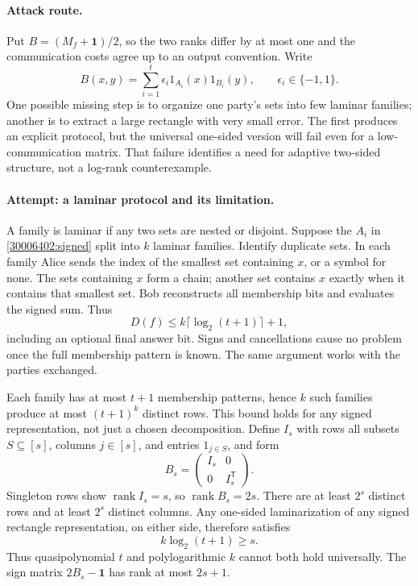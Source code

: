 \documentclass[11pt,a4paper]{article}
\numberwithin{equation}{section}
\begin{document}
\paragraph{Attack route.}
Put $B=(M_f+\mathbf1)/2$, so the two ranks differ by at most one and the
communication costs agree up to an output convention. Write
\begin{equation}\label{30006402:signed}
 B(x,y)=\sum_{i=1}^t\epsilon_i1_{A_i}(x)1_{B_i}(y),
 \qquad\epsilon_i\in\{-1,1\}.
\end{equation}
One possible missing step is to organize one party's sets into few laminar
families; another is to extract a large rectangle with very small error.
The first produces an explicit protocol, but the universal one-sided version
will fail even for a low-communication matrix. That failure identifies a
need for adaptive two-sided structure, not a log-rank counterexample.

\paragraph{Attempt: a laminar protocol and its limitation.}
A family is laminar if any two sets are nested or disjoint. Suppose the
$A_i$ in \eqref{30006402:signed} split into $k$ laminar families. Identify duplicate
sets. In each family Alice sends the index of the smallest set containing
$x$, or a symbol for none. The sets containing $x$ form a chain; another
set contains $x$ exactly when it contains that smallest set. Bob reconstructs
all membership bits and evaluates the signed sum. Thus
\begin{equation}\label{30006402:protocol}
 D(f)\le k\lceil\log_2(t+1)\rceil+1,
\end{equation}
including an optional final answer bit. Signs and cancellations cause no
problem once the full membership pattern is known. The same argument works
with the parties exchanged.

Each family has at most $t+1$ membership patterns, hence $k$ such families
produce at most $(t+1)^k$ distinct rows. This bound holds for any signed
representation, not just a chosen decomposition. Define $I_s$ with rows
all subsets $S\subseteq[s]$, columns $j\in[s]$, and entries $1_{j\in S}$,
and form
\[
 B_s=\begin{pmatrix}I_s&0\\0&I_s^{\mathsf T}\end{pmatrix}.
\]
Singleton rows show $\operatorname{rank}I_s=s$, so
$\operatorname{rank}B_s=2s$. There are at least $2^s$ distinct rows and at
least $2^s$ distinct columns. Any one-sided laminarization of any signed
rectangle representation, on either side, therefore satisfies
\begin{equation}\label{30006402:obstruction}
 k\log_2(t+1)\ge s.
\end{equation}
Thus quasipolynomial $t$ and polylogarithmic $k$ cannot both hold universally.
The sign matrix $2B_s-\mathbf1$ has rank at most $2s+1$.
\end{document}

